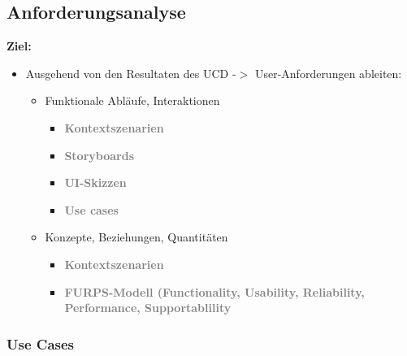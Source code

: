 \documentclass[../ZF_SWEN1.tex]{subfiles}
\begin{document}
\subsection{Anforderungsanalyse}

\textbf{Ziel:}\\
\begin{itemize}
	\item Ausgehend von den Resultaten des UCD -$>$ User-Anforderungen ableiten:
	\begin{itemize}
		\item Funktionale Abläufe, Interaktionen 
		\begin{itemize}
			\item \textcolor {gray} {\textbf{Kontextszenarien}}
			\item \textcolor {gray} {\textbf{Storyboards}}
			\item \textcolor {gray} {\textbf{UI-Skizzen}}
			\item \textcolor {gray} {\textbf{Use cases}}
		\end{itemize}
		\item Konzepte, Beziehungen, Quantitäten
		\begin{itemize}
			\item \textcolor {gray} {\textbf{Kontextszenarien}}
		\end{itemize}
		\begin{itemize}
			\item \textcolor {gray} {\textbf{FURPS-Modell (Functionality, Usability, Reliability, Performance, Supportablility}}
		
		\end{itemize}				
		
	\end{itemize}
\end{itemize}

\subsubsection{Use Cases}
\end{document}
